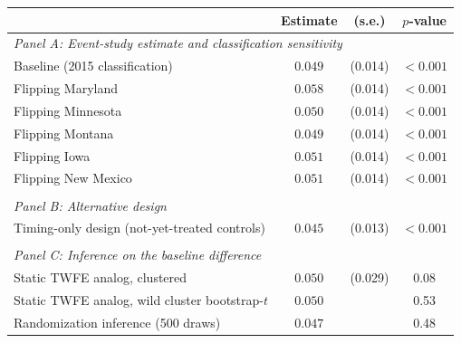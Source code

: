 \begin{tabular}{lccc}
\toprule
 & Estimate & (s.e.) & $p$-value \\
\midrule
\multicolumn{4}{l}{\textit{Panel A: Event-study estimate and classification sensitivity}} \\
\midrule
\quad Baseline (2015 classification) & $0.049$ & (0.014) & $<0.001$ \\
\quad Flipping Maryland & $0.058$ & (0.014) & $<0.001$ \\
\quad Flipping Minnesota & $0.050$ & (0.014) & $<0.001$ \\
\quad Flipping Montana & $0.049$ & (0.014) & $<0.001$ \\
\quad Flipping Iowa & $0.051$ & (0.014) & $<0.001$ \\
\quad Flipping New Mexico & $0.051$ & (0.014) & $<0.001$ \\
\\[0.5em]
\multicolumn{4}{l}{\textit{Panel B: Alternative design}} \\
\midrule
\quad Timing-only design (not-yet-treated controls) & $0.045$ & (0.013) & $<0.001$ \\
\\[0.5em]
\multicolumn{4}{l}{\textit{Panel C: Inference on the baseline difference}} \\
\midrule
\quad Static TWFE analog, clustered & $0.050$ & (0.029) & 0.08 \\
\quad Static TWFE analog, wild cluster bootstrap-$t$ & $0.050$ & & 0.53 \\
\quad Randomization inference (500 draws) & $0.047$ & & 0.48 \\
\bottomrule
\end{tabular}

